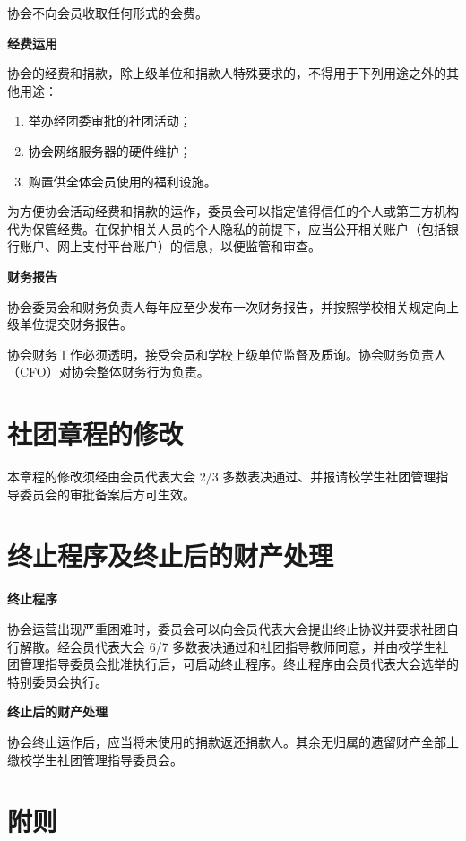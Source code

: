 	协会不向会员收取任何形式的会费。
	
	\term \textbf{经费运用}
	
	协会的经费和捐款，除上级单位和捐款人特殊要求的，不得用于下列用途之外的其他用途：
	
	\begin{enumerate}
		\item 举办经团委审批的社团活动；
		\item 协会网络服务器的硬件维护；
		\item 购置供全体会员使用的福利设施。
	\end{enumerate}
	
	为方便协会活动经费和捐款的运作，委员会可以指定值得信任的个人或第三方机构代为保管经费。在保护相关人员的个人隐私的前提下，应当公开相关账户（包括银行账户、网上支付平台账户）的信息，以便监管和审查。
	
	\term \textbf{财务报告}
	
	协会委员会和财务负责人每年应至少发布一次财务报告，并按照学校相关规定向上级单位提交财务报告。
	
	协会财务工作必须透明，接受会员和学校上级单位监督及质询。协会财务负责人（CFO）对协会整体财务行为负责。
	
	\section{社团章程的修改}
	
	\term 本章程的修改须经由会员代表大会 2/3 多数表决通过、并报请校学生社团管理指导委员会的审批备案后方可生效。
	
	\section{终止程序及终止后的财产处理}
	
	\term \textbf{终止程序}
	
	协会运营出现严重困难时，委员会可以向会员代表大会提出终止协议并要求社团自行解散。经会员代表大会 6/7 多数表决通过和社团指导教师同意，并由校学生社团管理指导委员会批准执行后，可启动终止程序。终止程序由会员代表大会选举的特别委员会执行。
	
	\term \textbf{终止后的财产处理}
	
	协会终止运作后，应当将未使用的捐款返还捐款人。其余无归属的遗留财产全部上缴校学生社团管理指导委员会。
	
	\section{附则}
	
